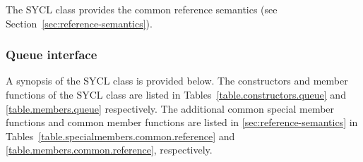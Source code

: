 The SYCL  class provides the common reference semantics
(see Section~\ref{sec:reference-semantics}).

\subsubsection{Queue interface}

A synopsis of the SYCL  class is provided below. The
constructors and member functions of the SYCL  class are
listed in Tables~\ref{table.constructors.queue} and \ref{table.members.queue}
respectively. The additional common special member functions and common member
functions are listed in \ref{sec:reference-semantics} in
Tables~\ref{table.specialmembers.common.reference} and
\ref{table.members.common.reference}, respectively.




